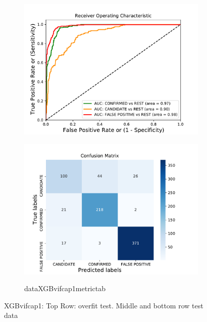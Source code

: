 \begin{figure}[H]
\begin{subfigure}{.49\textwidth}
                \includegraphics[width = 1\textwidth]{data/XGB_vif_cap1_roc.pdf}
                \end{subfigure}
                \begin{subfigure}{.49\textwidth}
                \includegraphics[width = 1\textwidth]{data/XGB_vif_cap1_cm.pdf}
                \end{subfigure}
                \begin{subfigure}{1\textwidth}
                \csname dataXGBvifcap1metrictab\endcsname
                \end{subfigure}
                \caption{XGBvifcap1: Top Row: overfit test. Middle and bottom row test data}
                \label{fig:data/XGB_vif_cap1_roc}
                \end{figure}